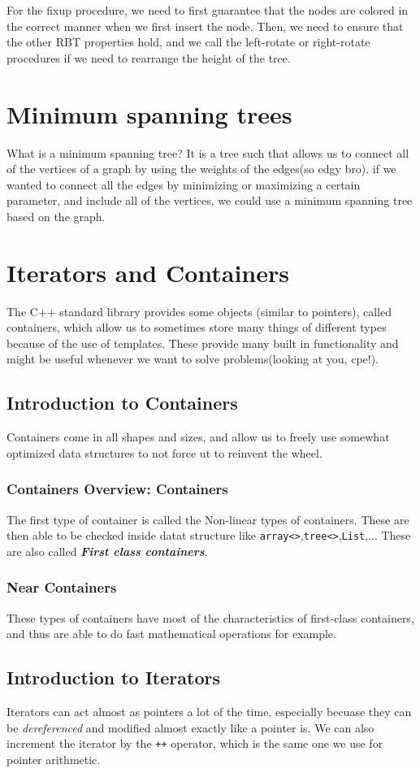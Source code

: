 \documentclass{article}
\begin{document}
For the fixup procedure, we need to first guarantee that the nodes are colored in the correct manner when we 
first insert the node. Then, we need to ensure that the other RBT properties hold, and we call the 
left-rotate or right-rotate procedures if we need to rearrange the height of the tree. 
\section{Minimum spanning trees}
What is  a minimum spanning tree? It is a tree such that allows us to connect all of the vertices of a 
graph by using the weights of the edges(so edgy bro). if we wanted to connect all the edges by minimizing 
or maximizing a certain parameter, and include all of the vertices, we could use a minimum spanning tree 
based on the graph.
\section{Iterators and Containers}
The C++ standard library provides some objects (similar to pointers), called containers, which allow us to 
sometimes store many things of different types because of the use of templates. These provide many built in 
functionality and might be useful whenever we want to solve problems(looking at you, cpe!).
\subsection{Introduction to Containers}
Containers come in all shapes and sizes, and allow us to freely use somewhat optimized data structures to not force
ut to reinvent the wheel.
\subsubsection{Containers Overview: Containers}
The first type of container is called the Non-linear types of containers. These  are then able to be checked
inside datat structure like \texttt{array<>},\texttt{tree<>},\texttt{List},...
These are also called \textit{\textbf{First class containers}}.
\subsubsection{Near Containers}
These types of containers have most of the characteristics of first-class containers, and thus are able to do fast 
mathematical operations for example.
\subsection{Introduction to Iterators}
Iterators can act almost as pointers a lot of the time, especially becuase they can be \textit{dereferenced} and 
modified almost exactly like a pointer is. We can also increment the iterator by the \texttt{++} operator, which is
the same one we use for pointer arithmetic.
\end{document}

